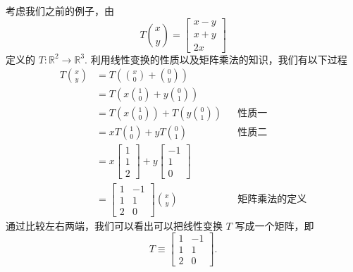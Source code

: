 考虑我们之前的例子，由
\[
T\binom{x}{y}=\begin{bmatrix}x-y\\x+y\\2x\end{bmatrix}
\]
定义的 $T:\mathbb{R}^2\to\mathbb{R}^3$. 利用线性变换的性质以及矩阵乘法的知识，我们有以下过程
\begin{align*}
T\binom{x}{y}
&=T\left(\binom{x}{0}+\binom{0}{y}\right)\\
&=T\left(x\binom{1}{0}+y\binom{0}{1}\right)\\
&=T\left(x\binom{1}{0}\right)+T\left(y\binom{0}{1}\right) &&\text{性质一}\\
&=xT\binom{1}{0}+yT\binom{0}{1} &&\text{性质二}\\
&=x\begin{bmatrix}1\\1\\2\end{bmatrix}+y\begin{bmatrix}-1\\1\\0\end{bmatrix}\\
&=\begin{bmatrix}1&-1\\1&1\\2&0\end{bmatrix}\binom{x}{y} &&\text{矩阵乘法的定义}
\end{align*}
通过比较左右两端，我们可以看出可以把线性变换 $T$ 写成一个矩阵，即
\[
T\equiv\begin{bmatrix}1&-1\\1&1\\2&0\end{bmatrix}.
\]

